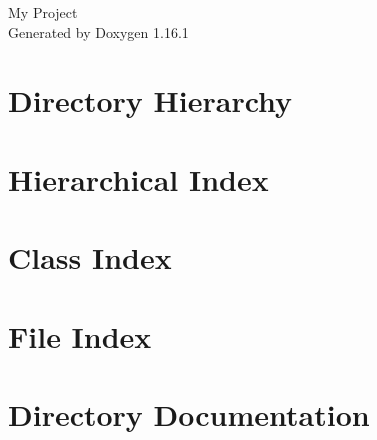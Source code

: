 \documentclass[twoside]{book}
\newcommand{\+}{\discretionary{\mbox{\scriptsize$\hookleftarrow$}}{}{}}
\newcommand{\clearemptydoublepage}{%
    \newpage{\pagestyle{empty}\cleardoublepage}%
  }
\begin{document}
  \raggedbottom
    \hypersetup{pageanchor=false,
                bookmarksnumbered=true,
                pdfencoding=unicode
               }
  \begin{titlepage}
  \vspace*{7cm}
  \begin{center}%
  {\Large My Project}\\
  \vspace*{1cm}
  {\large Generated by Doxygen 1.16.1}\\
  \end{center}
  \end{titlepage}
  \clearemptydoublepage
  \tableofcontents
  \clearemptydoublepage
  \hypersetup{pageanchor=true}
\chapter{Directory Hierarchy}

\chapter{Hierarchical Index}

\chapter{Class Index}

\chapter{File Index}

\chapter{Directory Documentation}













\end{document}
